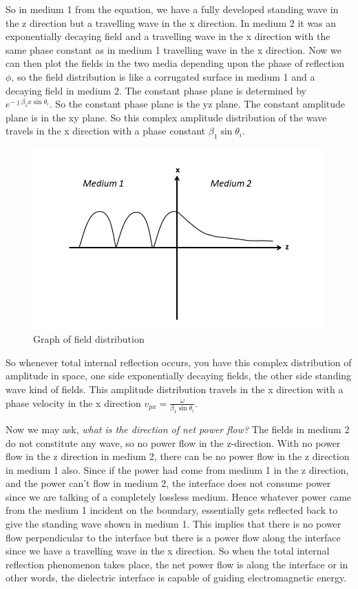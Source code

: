 So in medium 1 from the equation, we have a fully developed standing wave in the z direction but a travelling wave in the x direction. In medium 2 it was an exponentially decaying field and a travelling wave in the x direction with the same phase constant as in medium 1 travelling wave in the x direction. Now we can then plot the fields in the two media depending upon the phase of reflection $\phi$, so the field distribution is like a corrugated surface in medium 1 and a decaying field in medium 2. The constant phase plane is determined by $e^{- \jmath \beta_{1}x\sin\theta_i}$. So the constant phase plane is the yz plane. The constant amplitude plane is in the xy plane. So this complex amplitude distribution of the wave travels in the x direction with a phase constant $\beta_1\sin\theta_i$.
\begin{figure}[h]
\centering
\includegraphics[width=1\linewidth]{graphics/field_distribution_total_internal_reflection}
\caption{Graph of field distribution}
\end{figure}

So whenever total internal reflection occurs, you have this complex distribution of amplitude in space, one side exponentially decaying fields, the other side standing wave kind of fields. This amplitude distribution travels in the x direction with a phase velocity in the x direction $v_{px} = \frac{\omega}{\beta_1\sin\theta_i}$.

Now we may ask, \emph{what is the direction of net power flow?} The fields in medium 2 do not constitute any wave, so no power flow in the z-direction. With no power flow in the z direction in medium 2, there can be no power flow in the z direction in medium 1 also. Since if the power had come from medium 1 in the z direction, and the power can't flow in medium 2, the interface does not consume power since we are talking of a completely lossless medium. Hence whatever power came from the medium 1 incident on the boundary, essentially gets reflected back to give the standing wave shown in medium 1. This implies that there is no power flow perpendicular to the interface but there is a power flow along the interface since we have a travelling wave in the x direction. So when the total internal reflection phenomenon takes place, the net power flow is along the interface or in other words, the dielectric interface is capable of guiding electromagnetic energy.

